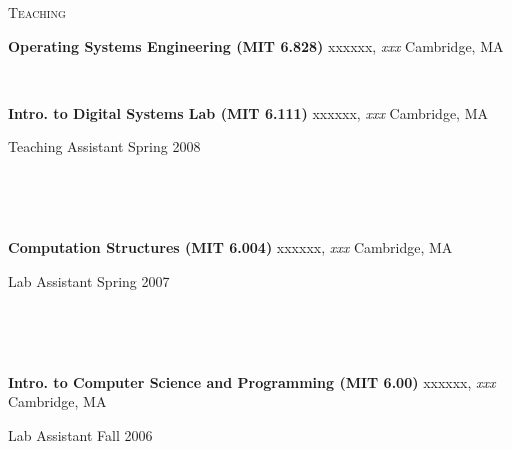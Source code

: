 \documentclass[10pt,times]{report}
\newlength{\sectiongap}
\newlength{\entrygap}
\newlength{\sectioncolwidth}
\newlength{\colgap}
\newlength{\stuffwidth}
\def\ifEqString#1#2{\def\testa{#1}\def\testb{#2}%
  \ifx\testa\testb}
\newenvironment{rtable}{
  \begin{minipage}{\textwidth}
  }{
  \end{minipage}
}
\newenvironment{rentry}[3][xxx]{
  \begin{minipage}[t]{\hsize}
    \textbf{#2}\ifEqString{#1}{xxx}\relax\else, \textit{#1}\fi
    \hspace{\stretch{1}} #3 \\
  }{
    \removelastskip
  \end{minipage}
  \\[\entrygap]  %
}
\newcommand{\rline}[2]{
  \begin{minipage}[t]{\hsize}
    #1 \hspace{\stretch{1}} #2
  \end{minipage} \\
}
\newenvironment{rsection}[1]{
  \begin{minipage}[t]{\sectioncolwidth}
    \textsc{#1}
  \end{minipage}
  \hspace{\colgap}
  \begin{minipage}[t]{\stuffwidth}
  }{
    \removelastskip
  \end{minipage}
  \\[\sectiongap]
}
\begin{document}
\begin{rtable}
\begin{rsection}{Teaching}
\begin{rentry}{Operating Systems Engineering (MIT
        6.828)}{Cambridge, MA}
    \end{rentry}
    \begin{rentry}{Intro. to Digital Systems Lab (MIT
        6.111)}{Cambridge, MA}
      \rline{Teaching Assistant}{Spring 2008}
      \vspace{-0.5em}
    \end{rentry}
    \begin{rentry}{Computation Structures (MIT 6.004)}{Cambridge, MA}
      \rline{Lab Assistant}{Spring 2007}
      \vspace{-0.5em}
    \end{rentry}
    \begin{rentry}{Intro. to Computer Science and
        Programming (MIT 6.00)}{Cambridge, MA}
      \rline{Lab Assistant}{Fall 2006}
      \vspace{-0.5em}
    \end{rentry}
  \end{rsection}


\end{rtable}
\end{document}
